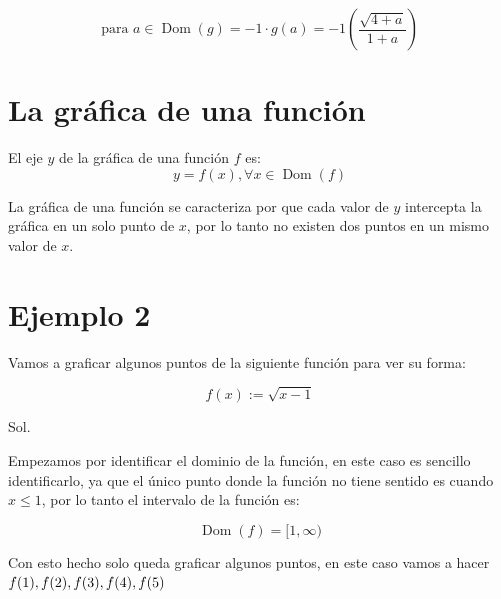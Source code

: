 \begin{displaymath}
    \text{para } a \in \operatorname{Dom}(g) = -1 \cdot g(a) = -1 \left( \frac{\sqrt{4+a}}{1+a} \right)  
\end{displaymath}

\section{La gráfica de una función}

\begin{definition}
    El eje \(y\) de la gráfica de una función \(f\) es:
    \[y = f(x), \forall x \in \operatorname{Dom}(f)\]
\end{definition}

La gráfica de una función se caracteriza por que cada valor de \(y\) intercepta la gráfica en un solo punto de \(x\), por lo tanto no existen dos puntos en un mismo valor de \(x\).

\section{Ejemplo 2}

Vamos a graficar algunos puntos de la siguiente función para ver su forma:

\begin{displaymath}
    f(x) := \sqrt{x-1}
\end{displaymath}

Sol. 

Empezamos por identificar el dominio de la función, en este caso es sencillo identificarlo, ya que el único punto donde la función no tiene sentido es cuando \(x \leq 1\), por lo tanto el intervalo de la función es:

\begin{displaymath}
    \operatorname{Dom}(f) = [1,\infty)
\end{displaymath}

Con esto hecho solo queda graficar algunos puntos, en este caso vamos a hacer \(f(1),f(2), \\ f(3),f(4),f(5)\)

